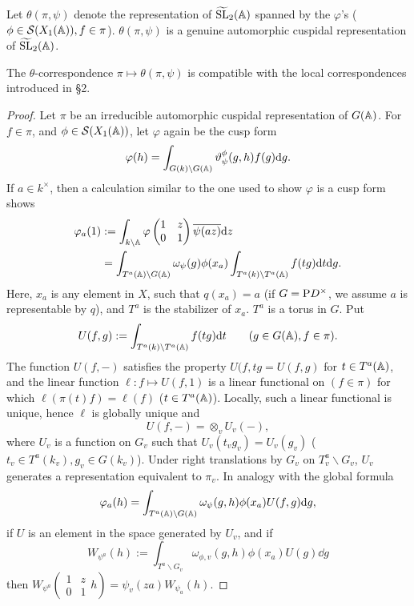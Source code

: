 Let $\theta(\pi, \psi)$ denote the representation of $\widetilde{\mathrm{SL}}_2(\mathbb{A})$ spanned by the $\varphi$'s ($\phi \in \mathcal{S}(X_1(\mathbb{A})), f \in \pi$).
$\theta(\pi, \psi)$ is a genuine automorphic cuspidal representation of $\widetilde{\mathrm{SL}}_2(\mathbb{A})$.

\begin{theorem}
\label{thm:3.1}
The $\theta$-correspondence $\pi \mapsto \theta(\pi, \psi)$ is compatible with the local correspondences introduced in \S 2.
\end{theorem}

\begin{proof}
Let $\pi$ be an irreducible automorphic cuspidal representation of $G(\mathbb{A})$. For $f \in \pi$, and $\phi \in \mathcal{S}(X_1(\mathbb{A}))$, let $\varphi$ again be the cusp form
\[
\varphi(h) = \int_{G(k) \backslash G(\mathbb{A})} \vartheta_{\psi}^\phi(g, h) f(g) \mathrm{d} g.
\]
If $a \in k^\times$, then a calculation similar to the one used to show $\varphi$ is a cusp form shows
\begin{align}
    \varphi_a(1) &:= \int_{k \backslash \mathbb{A}} \varphi \begin{pmatrix}
        1 & z \\ 0& 1
    \end{pmatrix} \overline{\psi(az)} \mathrm{d} z \nonumber \\ 
    &= \int_{T^a(\mathbb{A}) \backslash G(\mathbb{A})} \omega_\psi(g) \phi(x_a) \int_{T^a(k) \backslash T^a(\mathbb{A})} f(tg) \mathrm{d} t \mathrm{d} g. \label{eqn:F}
\end{align}
Here, $x_a$ is any element in $X$, such that $q(x_a) = a$ (if $G = \mathrm{P} D^\times$, we assume $a$ is representable by $q$), and $T^a$ is the stabilizer of $x_a$.
$T^a$ is a torus in $G$.
Put
\[
U(f, g) := \int_{T^a(k) \backslash T^a(\mathbb{A})} f(tg) \mathrm{d} t\qquad (g \in G(\mathbb{A}), f \in \pi).
\]
The function $U(f, -)$ satisfies the property $U(f, tg = U(f, g)$ for $t \in T^a(\mathbb{A})$, and the linear function $\ell: f \mapsto U(f, 1)$ is a linear functional on $(f\in \pi)$ for which $\ell(\pi(t)f) = \ell(f)$ ($t \in T^a(\mathbb{A})$).
Locally, such a linear functional is unique, hence $\ell$ is globally unique and
\[
U(f, -) = \otimes_v U_v(-),
\]
where $U_v$ is a function on $G_v$ such that $U_v(t_v g_v) = U_v(g_v)$ ($t_v \in T^a(k_v), g_v \in G(k_v)$).
Under right translations by $G_v$ on $T^a_v \backslash G_v$, $U_v$ generates a representation equivalent to $\pi_v$. In analogy with the global formula
\[
\varphi_a(h) = \int_{T^a(\mathbb{A}) \backslash G(\mathbb{A})} \omega_\psi(g, h) \phi(x_a) U(f, g) \mathrm{d} g,
\]
if $U$ is an element in the space generated by $U_v$, and if
\[
W_{\psi^a}(h) := \int_{T^a \backslash G_v} \omega_{\phi, v}(g, h) \phi(x_a) U(g) \dd g
\]
then $W_{\psi^a}\left(\begin{smallmatrix}
    1 & z \\ 0 & 1
\end{smallmatrix}h\right) = \psi_v(za) W_{\psi_a}(h)$.
\end{proof}

